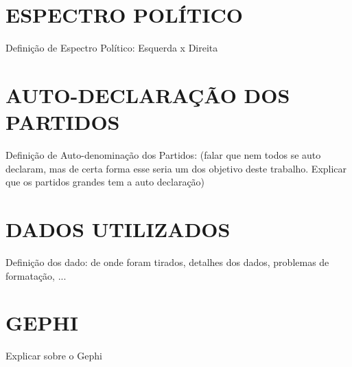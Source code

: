\section{\texorpdfstring{\MakeUppercase{Espectro Político}}{}}
\label{secao_espectro_politico}

Definição de Espectro Político: Esquerda x Direita


\section{\texorpdfstring{\MakeUppercase{Auto-declaração dos Partidos}}{}}
\label{secao_auto_declaracao_partidos}

Definição de Auto-denominação dos Partidos: (falar que nem todos se auto declaram, mas de certa forma esse seria um dos objetivo deste trabalho. Explicar que os partidos grandes tem a auto declaração)


\section{\texorpdfstring{\MakeUppercase{Dados utilizados}}{}}
\label{secao_dados_utilizados}

Definição dos dado: de onde foram tirados, detalhes dos dados, problemas de formatação, ...

\section{\texorpdfstring{\MakeUppercase{Gephi}}{}}
\label{secao_gephi}

Explicar sobre o Gephi
